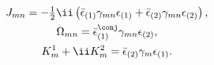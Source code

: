 \begin{equation}
\begin{gathered}
   J_{mn} = - \tfrac{1}{2} \ii \left(
         \bar{\epsilon}_{(1)}\gamma_{mn}\epsilon_{(1)}
         + \bar{\epsilon}_{(2)}\gamma_{mn}\epsilon_{(2)} 
      \right) , \\
   \Omega_{mn} = 
      \bar{\epsilon}_{(1)}^\conj\gamma_{mn}\epsilon_{(2)} , \\
   K^1_m + \ii K^2_m = \bar{\epsilon}_{(2)}\gamma_m\epsilon_{(1)} .
\end{gathered}
\end{equation}

